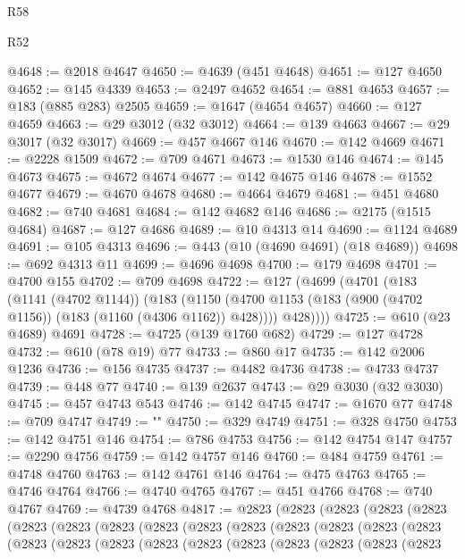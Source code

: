 \begin{lexlean}{R58}
\begin{lexlean}{R52}
\begin{coremodule}
{{{{{{{{{{{{{{{{{{{{{{{{{{{{{{{{{{{{{{{{{{{{{{{{{{{{{{{{{{{{{{{{{{{{{{{{{{{{{{{{{{{{{{{{{{{{{{{{{{{{{{{{{{{{{{{{{{{{{{{{{{{{{{{{{{{{{{{{{{{{{{{{{{{{{{{{{{{{{{{{{{{{{{{{{{{{{{{{{{{{{{{{{{{{{{{{{{{{{{@4648 := @2018 @4647
@4650 := @4639 (@451 @4648)
@4651 := @127 @4650
@4652 := @145 @4339
@4653 := @2497 @4652
@4654 := @881 @4653
@4657 := @183 (@885 @283) @2505
@4659 := @1647 (@4654 @4657)
@4660 := @127 @4659
@4663 := @29 @3012 (@32 @3012)
@4664 := @139 @4663
@4667 := @29 @3017 (@32 @3017)
@4669 := @457 @4667 @146
@4670 := @142 @4669
@4671 := @2228 @1509
@4672 := @709 @4671
@4673 := @1530 @146
@4674 := @145 @4673
@4675 := @4672 @4674
@4677 := @142 @4675 @146
@4678 := @1552 @4677
@4679 := @4670 @4678
@4680 := @4664 @4679
@4681 := @451 @4680
@4682 := @740 @4681
@4684 := @142 @4682 @146
@4686 := @2175 (@1515 @4684)
@4687 := @127 @4686
@4689 := @10 @4313 @14
@4690 := @1124 @4689
@4691 := @105 @4313
@4696 := @443 (@10 (@4690 @4691) (@18 @4689))
@4698 := @692 @4313 @11
@4699 := @4696 @4698
@4700 := @179 @4698
@4701 := @4700 @155
@4702 := @709 @4698
@4722 := @127
    (@4699
      (@4701
        (@183
          (@1141 (@4702 @1144))
          (@183
            (@1150 (@4700 @1153 (@183 (@900 (@4702 @1156)) (@183 (@1160 (@4306 @1162)) @428))))
            @428))))
@4725 := @610 (@23 @4689) @4691
@4728 := @4725 (@139 @1760 @682)
@4729 := @127 @4728
@4732 := @610 (@78 @19) @77
@4733 := @860 @17
@4735 := @142 @2006 @1236
@4736 := @156 @4735
@4737 := @4482 @4736
@4738 := @4733 @4737
@4739 := @448 @77
@4740 := @139 @2637
@4743 := @29 @3030 (@32 @3030)
@4745 := @457 @4743 @543
@4746 := @142 @4745
@4747 := @1670 @77
@4748 := @709 @4747
@4749 := "\n"
@4750 := @329 @4749
@4751 := @328 @4750
@4753 := @142 @4751 @146
@4754 := @786 @4753
@4756 := @142 @4754 @147
@4757 := @2290 @4756
@4759 := @142 @4757 @146
@4760 := @484 @4759
@4761 := @4748 @4760
@4763 := @142 @4761 @146
@4764 := @475 @4763
@4765 := @4746 @4764
@4766 := @4740 @4765
@4767 := @451 @4766
@4768 := @740 @4767
@4769 := @4739 @4768
@4817 := @2823
    (@2823
      (@2823
        (@2823
          (@2823
            (@2823
              (@2823
                (@2823
                  (@2823
                    (@2823
                      (@2823
                        (@2823
                          (@2823
                            (@2823
                              (@2823
                                (@2823
                                  (@2823
                                    (@2823
                                      (@2823
                                        (@2823
                                          (@2823
                                            (@2823
                                              (@2823
                                                (@2823
                                                  (@2823
}}}}}}}}}}}}}}}}}}}}}}}}}}}}}}}}}}}}}}}}}}}}}}}}}}}}}}}}}}}}}}}}}}}}}}}}}}}}}}}}}}}}}}}}}}}}}}}}}}}}}}}}}}}}}}}}}}}}}}}}}}}}}}}}}}}}}}}}}}}}}}}}}}}}}}}}}}}}}}}}}}}}}}}}}}}}}}}}}}}}}}}}}}}}}}}}}}}}}}
\end{coremodule}
\end{lexlean}
\end{lexlean}
